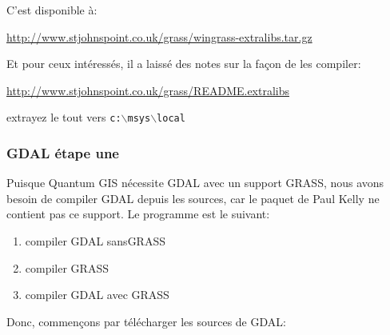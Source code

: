 C'est disponible \`a:

\url{http://www.stjohnspoint.co.uk/grass/wingrass-extralibs.tar.gz}

Et pour ceux int\'eress\'es, il a laiss\'e des notes sur la fa\c{c}on de les compiler:

\url{http://www.stjohnspoint.co.uk/grass/README.extralibs}

extrayez le tout vers \texttt{c:$\backslash$msys$\backslash$local}

% 
% 
% 
% 
% 

\subsubsection{GDAL \'etape une}
Puisque Quantum GIS n\'ecessite GDAL avec un support GRASS, nous avons besoin de compiler GDAL depuis les sources, car le paquet de Paul Kelly ne contient pas ce support.
Le programme est le suivant:

\begin{enumerate}
\item compiler GDAL sansGRASS
\item compiler GRASS
\item compiler GDAL avec GRASS
\end{enumerate}

Donc, commen\c{c}ons par t\'el\'echarger les sources de GDAL:

